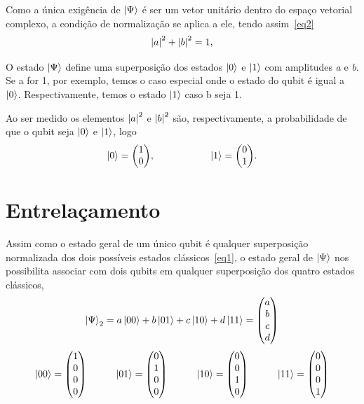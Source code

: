 \documentclass[a4paper, 12pt, oneside]{book}
\begin{document}
Como a única exigência de $\ket{\Psi}$ é ser um vetor unitário dentro do espaço vetorial complexo, a condição de normalização se aplica a ele, tendo assim~\eqref{eq2}
\begin{equation}\label{eq2}
\abs{a}^2 + \abs{b}^2 = 1,
\end{equation}

O estado $\ket{\Psi}$ define uma superposição dos estados $\ket{0}$ e $\ket{1}$ com amplitudes \textit{a} e \textit{b}. Se a for 1, por exemplo, temos o caso especial onde o estado do qubit é igual a $\ket{0}$. Respectivamente, temos o estado $\ket{1}$ caso b seja 1.

Ao ser medido os elementos $\abs{a}^2$ e $\abs{b}^2$ são, respectivamente, a probabilidade de que o qubit seja $\ket{0}$ e $\ket{1}$, logo 
\begin{align*} 
  \ket{0} = \mqty(1\\0) ,\hspace{2cm} 
  \ket{1} = \mqty(0\\1).
\end{align*}


\section{Entrelaçamento}
Assim como o estado geral de um único qubit é qualquer superposição normalizada dos dois possíveis estados clássicos~\eqref{eq1}, o estado geral de $\ket{\Psi}$ nos possibilita associar com dois qubits em qualquer superposição dos quatro estados clássicos,
\begin{equation}\label{eq3}
\ket{\Psi}_2 = a\ket{00} + b\ket{01} + c\ket{10} + d\ket{11} = \mqty(a\\b\\c\\d)
\end{equation}
\begin{align*}
  \ket{00} = \mqty(1\\0\\0\\0) \hspace{1cm} 
  \ket{01} = \mqty(0\\1\\0\\0) \hspace{1cm} 
  \ket{10} = \mqty(0\\0\\1\\0) \hspace{1cm} 
  \ket{11} = \mqty(0\\0\\0\\1)
\end{align*}
\end{document}
